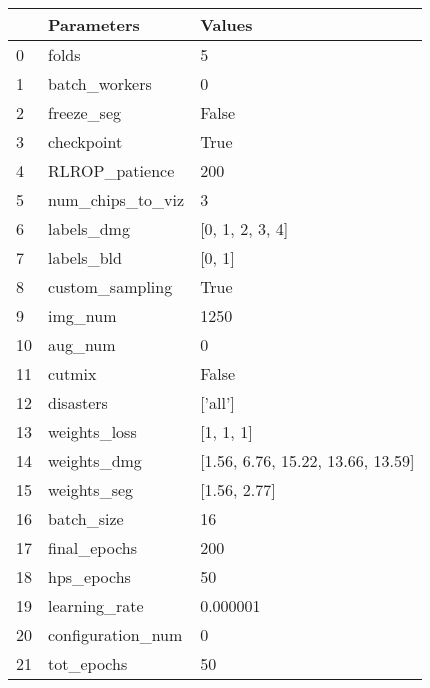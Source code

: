 \begin{tabular}{lll}
\toprule
 & Parameters & Values \\
\midrule
0 & folds & 5 \\
1 & batch_workers & 0 \\
2 & freeze_seg & False \\
3 & checkpoint & True \\
4 & RLROP_patience & 200 \\
5 & num_chips_to_viz & 3 \\
6 & labels_dmg & [0, 1, 2, 3, 4] \\
7 & labels_bld & [0, 1] \\
8 & custom_sampling & True \\
9 & img_num & 1250 \\
10 & aug_num & 0 \\
11 & cutmix & False \\
12 & disasters & ['all'] \\
13 & weights_loss & [1, 1, 1] \\
14 & weights_dmg & [1.56, 6.76, 15.22, 13.66, 13.59] \\
15 & weights_seg & [1.56, 2.77] \\
16 & batch_size & 16 \\
17 & final_epochs & 200 \\
18 & hps_epochs & 50 \\
19 & learning_rate & 0.000001 \\
20 & configuration_num & 0 \\
21 & tot_epochs & 50 \\
\bottomrule
\end{tabular}

